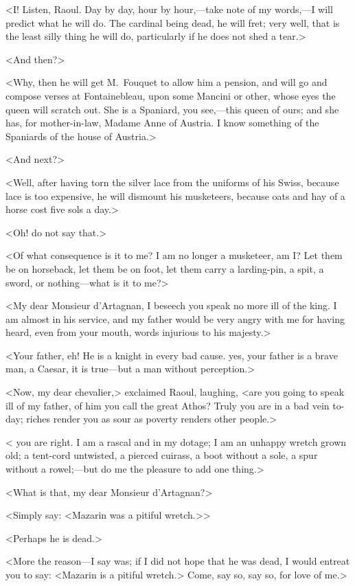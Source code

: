 <I\@! Listen, Raoul. Day by day, hour by hour,—take note of my words,—I will predict what he will do. The cardinal being dead, he will fret; very well, that is the least silly thing he will do, particularly if he does not shed a tear.>

<And then?>

<Why, then he will get M.~Fouquet to allow him a pension, and will go and compose verses at Fontainebleau, upon some Mancini or other, whose eyes the queen will scratch out. She is a Spaniard, you see,—this queen of ours; and she has, for mother-in-law, Madame Anne of Austria. I know something of the Spaniards of the house of Austria.>

<And next?>

<Well, after having torn the silver lace from the uniforms of his Swiss, because lace is too expensive, he will dismount his musketeers, because oats and hay of a horse cost five sols a day.>

<Oh! do not say that.>

<Of what consequence is it to me? I am no longer a musketeer, am I\@? Let them be on horseback, let them be on foot, let them carry a larding-pin, a spit, a sword, or nothing—what is it to me?>

<My dear Monsieur d'Artagnan, I beseech you speak no more ill of the king. I am almost in his service, and my father would be very angry with me for having heard, even from your mouth, words injurious to his majesty.>

<Your father, eh! He is a knight in every bad cause.  yes, your father is a brave man, a Caesar, it is true—but a man without perception.>

<Now, my dear chevalier,> exclaimed Raoul, laughing, <are you going to speak ill of my father, of him you call the great Athos? Truly you are in a bad vein to-day; riches render you as sour as poverty renders other people.>

< you are right. I am a rascal and in my dotage; I am an unhappy wretch grown old; a tent-cord untwisted, a pierced cuirass, a boot without a sole, a spur without a rowel;—but do me the pleasure to add one thing.>

<What is that, my dear Monsieur d'Artagnan?>

<Simply say: <Mazarin was a pitiful wretch.>>

<Perhaps he is dead.>

<More the reason—I say was; if I did not hope that he was dead, I would entreat you to say: <Mazarin is a pitiful wretch.> Come, say so, say so, for love of me.>

